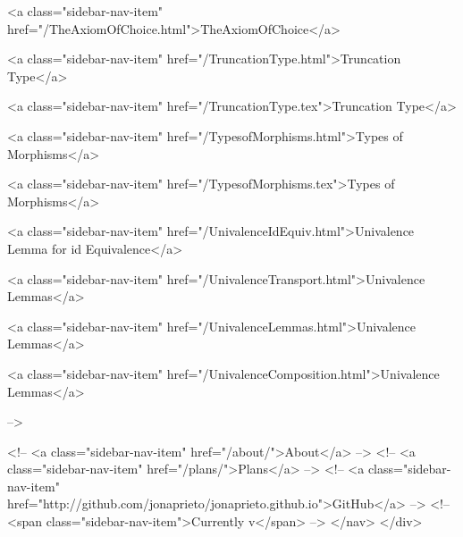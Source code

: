       
    
      
        
          <a class="sidebar-nav-item" href="/TheAxiomOfChoice.html">TheAxiomOfChoice</a>
        
      
    
      
        
          <a class="sidebar-nav-item" href="/TruncationType.html">Truncation Type</a>
        
      
    
      
        
          <a class="sidebar-nav-item" href="/TruncationType.tex">Truncation Type</a>
        
      
    
      
        
          <a class="sidebar-nav-item" href="/TypesofMorphisms.html">Types of Morphisms</a>
        
      
    
      
        
          <a class="sidebar-nav-item" href="/TypesofMorphisms.tex">Types of Morphisms</a>
        
      
    
      
        
          <a class="sidebar-nav-item" href="/UnivalenceIdEquiv.html">Univalence Lemma for id Equivalence</a>
        
      
    
      
        
          <a class="sidebar-nav-item" href="/UnivalenceTransport.html">Univalence Lemmas</a>
        
      
    
      
        
          <a class="sidebar-nav-item" href="/UnivalenceLemmas.html">Univalence Lemmas</a>
        
      
    
      
        
          <a class="sidebar-nav-item" href="/UnivalenceComposition.html">Univalence Lemmas</a>
        
      
     -->

    <!-- <a class="sidebar-nav-item" href="/about/">About</a> -->
    <!-- <a class="sidebar-nav-item" href="/plans/">Plans</a> -->
    <!-- <a class="sidebar-nav-item" href="http://github.com/jonaprieto/jonaprieto.github.io">GitHub</a> -->
    <!-- <span class="sidebar-nav-item">Currently v</span> -->
  </nav>
</div>

